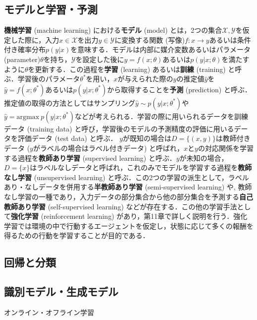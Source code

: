 \subsection{モデルと学習・予測}
\textbf{機械学習} (machine learning) における\textbf{モデル} (model) とは，2つの集合$\mathcal{X}, \mathcal{Y}$を仮定した際に，入力$x\in \mathcal{X}$を出力$y\in \mathcal{Y}$に変換する関数 (写像)$f: x \to y$あるいは条件付き確率分布$p(y|x)$を意味する．モデルは内部に媒介変数あるいはパラメータ (parameter)$\theta$を持ち，$\mathcal{Y}$を設定した後に$y=f(x; \theta)$あるいは$p(y|x; \theta)$を満たすように$\theta$を更新する．この過程を\textbf{学習} (learning) あるいは\textbf{訓練} (training) と呼ぶ．学習後のパラメータ$\theta^*$を用い，$x$が与えられた際の$y$の推定値$\hat{y}$を$\hat{y}=f(x; \theta^*)$あるいは$p(y|x; \theta^*)$から取得することを\textbf{予測} (prediction) と呼ぶ．推定値の取得の方法としてはサンプリング$\hat{y}\sim p(y|x; \theta^*)$や$\hat{y}=\textrm{argmax}\ p(y|x; \theta^{*})$などが考えられる．学習の際に用いられるデータを訓練データ (training data) と呼び，学習後のモデルの予測精度の評価に用いるデータを評価データ (test data) と呼ぶ．
$y$が既知の場合は$D=\{(x,y)\}$は教師付きデータ ($y$がラベルの場合はラベル付きデータ) と呼ばれ，$x$と$y$の対応関係を学習する過程を\textbf{教師あり学習} (supervised learning) と呼ぶ．$y$が未知の場合，$D=\{x\}$はラベルなしデータと呼ばれ，これのみでモデルを学習する過程を\textbf{教師なし学習} (unsupervised learning) と呼ぶ．この2つの学習の派生として，ラベルあり・なしデータを併用する\textbf{半教師あり学習} (semi-supervised learning) や, 教師なし学習の一種であり，入力データの部分集合から他の部分集合を予測する\textbf{自己教師あり学習} (self-supervised learning) などが存在する．この他の学習手法として\textbf{強化学習} (reinforcement learning) があり，第11章で詳しく説明を行う．強化学習では環境の中で行動するエージェントを仮定し，状態に応じて多くの報酬を得るための行動を学習することが目的である．
\subsection{回帰と分類}
\subsection{識別モデル・生成モデル}
オンライン・オフライン学習
